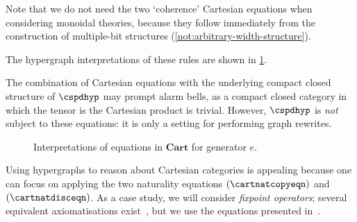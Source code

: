 \begin{remark}
    Note that we do not need the two `coherence' Cartesian equations when
    considering monoidal theories, because they follow immediately from the
    construction of multiple-bit structures
    (\cref{not:arbitrary-width-structure}).
\end{remark}



The hypergraph interpretations of these rules are shown in
\cref{fig:cartesian-graphs}.

\begin{remark}
    The combination of Cartesian equations with the underlying compact closed
    structure of \(\cspdhyp\) may prompt alarm bells, as a compact closed
    category in which the tensor is the Cartesian product is trivial.
    However, \(\cspdhyp\) is \emph{not} subject to
    these equations: it is only a setting for performing graph
    rewrites.
\end{remark}

\begin{figure}
    \centering
    

    
    \caption{
        Interpretations of equations in \(\mathbf{Cart}\) for
        generator \(e\).
    }
    \label{fig:cartesian-graphs}
\end{figure}

Using hypergraphs to reason about Cartesian categories is appealing because one
can focus on applying the two naturality equations
\((\cartnatcopyeqn)\) and \((\cartnatdisceqn)\).
As a case study, we will consider \emph{fixpoint operators}; several equivalent
axiomatisations exist~\cite{hasegawa1997recursion,simpson2000complete}, but we
use the equations presented in~\cite{hasegawa2009traced}.

